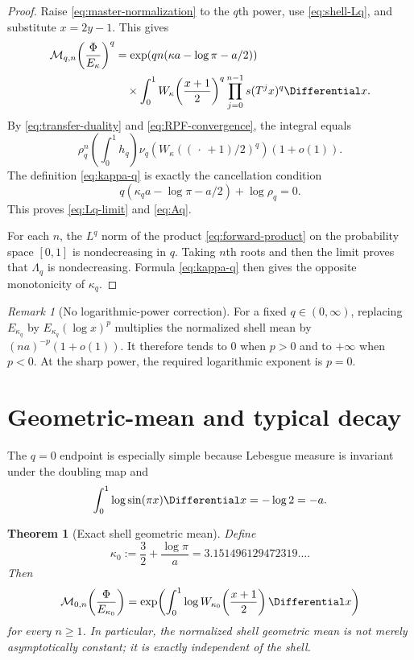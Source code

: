 \documentclass[11pt,oneside]{article}
\newtheorem{theorem}{Theorem}[section]
\theoremstyle{definition}
\theoremstyle{remark}
\newtheorem{remark}[remark]{Remark}
\newcommand{\Phiup}{\Phi}
\begin{document}
\begin{proof}
Raise \eqref{eq:master-normalization} to the $q$th power, use
\eqref{eq:shell-Lq}, and substitute $x=2y-1$.  This gives
\begin{align*}
 \mathcal M_{q,n}\!\left(\frac{\Phiup}{E_\kappa}\right)^q
 &=\exp\!\left(qn(\kappa a-\log\pi-a/2)\right)\\
 &\quad\times\int_0^1
 W_\kappa\!\left(\frac{x+1}{2}\right)^q
 \prod_{j=0}^{n-1}s(T^jx)^q\Differential x.
\end{align*}
By \eqref{eq:transfer-duality} and \eqref{eq:RPF-convergence}, the integral equals
\[
 \rho_q^n\left(\int_0^1h_q\right)
 \nu_q\!\left(W_\kappa((\,\cdot\,+1)/2)^q\right)(1+o(1)).
\]
The definition \eqref{eq:kappa-q} is exactly the cancellation condition
\[
 q(\kappa_q a-\log\pi-a/2)+\log\rho_q=0.
\]
This proves \eqref{eq:Lq-limit} and \eqref{eq:Aq}.

For each $n$, the $L^q$ norm of the product \eqref{eq:forward-product} on the probability
space $[0,1]$ is nondecreasing in $q$.  Taking $n$th roots and then the limit proves that
$\Lambda_q$ is nondecreasing.  Formula \eqref{eq:kappa-q} then gives the opposite
monotonicity of $\kappa_q$.
\end{proof}

\begin{remark}[No logarithmic-power correction]
\label{rem:no-log-correction}
For a fixed $q\in(0,\infty)$, replacing $E_{\kappa_q}$ by
$E_{\kappa_q}(\log x)^p$ multiplies the normalized shell mean by
$(na)^{-p}(1+o(1))$.  It therefore tends to $0$ when $p>0$ and to $+\infty$ when $p<0$.
At the sharp power, the required logarithmic exponent is $p=0$.
\end{remark}

\section{Geometric-mean and typical decay}
\label{sec:typical}

The $q=0$ endpoint is especially simple because Lebesgue measure is invariant under the
doubling map and
\begin{equation}
 \int_0^1\log\sin(\pi x)\Differential x=-\log2=-a.
 \label{eq:log-sine-integral}
\end{equation}

\begin{theorem}[Exact shell geometric mean]
\label{thm:geometric-mean}
Define
\begin{equation}
 \kappa_0:=\frac32+\frac{\log\pi}{a}
 =3.151496129472319\ldots .
 \label{eq:kappa0}
\end{equation}
Then
\begin{equation}
 \mathcal M_{0,n}\!\left(\frac{\Phiup}{E_{\kappa_0}}\right)
 =\exp\!\left(\int_0^1
    \log W_{\kappa_0}\!\left(\frac{x+1}{2}\right)\Differential x\right)
 \label{eq:exact-geometric-mean}
\end{equation}
for every $n\ge1$.  In particular, the normalized shell geometric mean is not merely
asymptotically constant; it is exactly independent of the shell.
\end{theorem}
\end{document}
